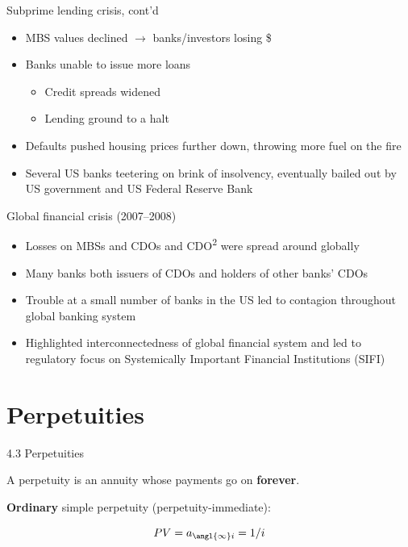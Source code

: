 \documentclass{beamer}
\begin{document}
\begin{frame}{Subprime lending crisis, cont'd}

\begin{itemize}
\item MBS values declined $\rightarrow$ banks/investors losing \$
\item Banks unable to issue more loans
  \begin{itemize}
  \item Credit spreads widened
  \item Lending ground to a halt
  \end{itemize}
\item Defaults pushed housing prices further down, throwing more fuel on the fire
\item Several US banks teetering on brink of insolvency, eventually bailed out by US government and US Federal Reserve Bank
\end{itemize}

\end{frame}

\begin{frame}{Global financial crisis (2007--2008)}

\begin{itemize}
\item Losses on MBSs and CDOs and CDO\textsuperscript{2} were spread around globally
\item Many banks both issuers of CDOs and holders of other banks' CDOs
\item Trouble at a small number of banks in the US led to contagion throughout global banking system
\item Highlighted interconnectedness of global financial system and led to regulatory focus on Systemically Important Financial Institutions (SIFI)
\end{itemize}

\end{frame}

\section{Perpetuities}

\begin{frame}{4.3 Perpetuities}

A perpetuity is an annuity whose payments go on \textbf{forever}.

\bigskip
\textbf{Ordinary} simple perpetuity (perpetuity-immediate):

\begin{center}
\end{center}

\[
PV = a_{\angl{\infty}i} = 1/i
\]

\end{frame}
\end{document}
